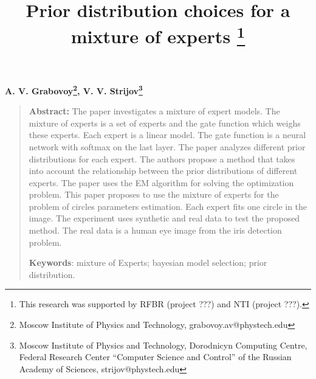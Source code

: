 \documentclass[12pt, twoside]{article}
\begin{document}
\title{\bf Prior distribution choices for a mixture of experts \thanks{This research was supported by RFBR (project ???) and NTI (project ???).}}
\date{}
\author{}
\maketitle

\begin{center}
\bf
A. V. Grabovoy\footnote{Moscow Institute of Physics and Technology, grabovoy.av@phystech.edu},
V. V. Strijov\footnote{Moscow Institute of Physics and Technology, Dorodnicyn Computing Centre, Federal Research Center “Computer Science and Control” of the Russian Academy of Sciences, strijov@phystech.edu}
\end{center}
{\centering\begin{quote}
\textbf{Abstract:} 
The paper investigates a mixture of expert models. 
The mixture of experts is a set of experts and the gate function which weighs these experts. Each expert is a linear model.
The gate function is a neural network with softmax on the last layer. 
The paper analyzes different prior distributions for each expert.
The authors propose a method that takes into account the relationship between the prior distributions of different experts.
The paper uses the EM algorithm for solving the optimization problem.
This paper proposes to use the mixture of experts for the problem of circles parameters estimation.
Each expert fits one circle in the image.
The experiment uses synthetic and real data to test the proposed method.
The real data is a human eye image from the iris detection problem.


\smallskip
\textbf{Keywords}: mixture of Experts; bayesian model selection; prior distribution.

\smallskip
\end{quote}
}
\end{document}
